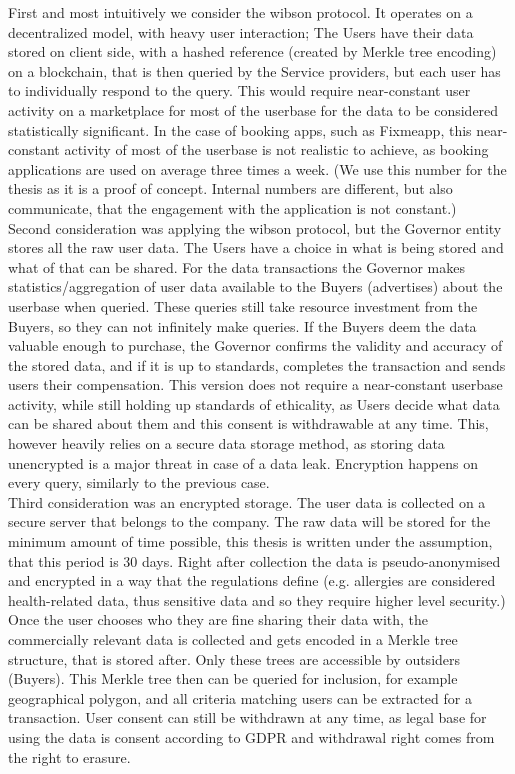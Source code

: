 \documentclass[a4paper,11pt]{report} %
\theoremstyle{change}
\theoremstyle{theoremstyle}
\begin{document}
First and most intuitively we consider the wibson protocol. It operates on a decentralized model, with heavy user interaction; The Users have their data stored on client side, with a hashed reference (created by Merkle tree encoding) on a blockchain, that is then queried by the Service providers, but each user has to individually respond to the query. This would require near-constant user activity on a marketplace for most of the userbase for the data to be considered statistically significant. In the case of booking apps, such as Fixmeapp, this near-constant activity of most of the userbase is not realistic to achieve, as booking applications are used on average three times a week. (We use this number for the thesis as it is a proof of concept. Internal numbers are different, but also communicate, that the engagement with the application is not constant.)\\
Second consideration was applying the wibson protocol, but the Governor entity stores all the raw user data. The Users have a choice in what is being stored and what of that can be shared. For the data transactions the Governor makes statistics/aggregation of user data available to the Buyers (advertises) about the userbase when queried. These queries still take resource investment from the Buyers, so they can not infinitely make queries. If the Buyers deem the data valuable enough to purchase, the Governor confirms the validity and accuracy of the stored data, and if it is up to standards, completes the transaction and sends users their compensation. This version does not require a near-constant userbase activity, while still holding up standards of ethicality, as Users decide what data can be shared about them and this consent is withdrawable at any time. This, however heavily relies on a secure data storage method, as storing data unencrypted is a major threat in case of a data leak. Encryption happens on every query, similarly to the previous case.\\
Third consideration was an encrypted storage. The user data is collected on a secure server that belongs to the company. The raw data will be stored for the minimum amount of time possible, this thesis is written under the assumption, that this period is 30 days. Right after collection the data is pseudo-anonymised and encrypted in a way that the regulations define (e.g. allergies are considered health-related data, thus sensitive data and so they require higher level security.) Once the user chooses who they are fine sharing their data with, the commercially relevant data is collected and gets encoded in a Merkle tree structure, that is stored after. Only these trees are accessible by outsiders (Buyers). This Merkle tree then can be queried for inclusion, for example geographical polygon, and all criteria matching users can be extracted for a transaction. User consent can still be withdrawn at any time, as legal base for using the data is consent according to GDPR \cite{GDPR2016} and withdrawal right comes from the right to erasure.\\
\end{document}
